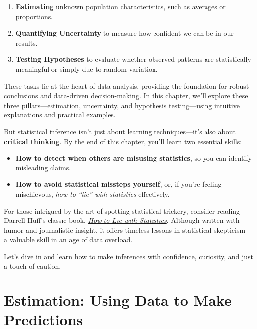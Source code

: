 \documentclass[
]{book}
\providecommand{\tightlist}{%
  \setlength{\itemsep}{0pt}\setlength{\parskip}{0pt}}
\theoremstyle{definition}
\theoremstyle{definition}
\theoremstyle{definition}
\theoremstyle{definition}
\theoremstyle{remark}
\begin{document}
\begin{enumerate}
\def\labelenumi{\arabic{enumi}.}
\tightlist
\item
  \textbf{Estimating} unknown population characteristics, such as averages or proportions.\\
\item
  \textbf{Quantifying Uncertainty} to measure how confident we can be in our results.\\
\item
  \textbf{Testing Hypotheses} to evaluate whether observed patterns are statistically meaningful or simply due to random variation.
\end{enumerate}

These tasks lie at the heart of data analysis, providing the foundation for robust conclusions and data-driven decision-making. In this chapter, we'll explore these three pillars---estimation, uncertainty, and hypothesis testing---using intuitive explanations and practical examples.

But statistical inference isn't just about learning techniques---it's also about \textbf{critical thinking}. By the end of this chapter, you'll learn two essential skills:

\begin{itemize}
\tightlist
\item
  \textbf{How to detect when others are misusing statistics}, so you can identify misleading claims.\\
\item
  \textbf{How to avoid statistical missteps yourself}, or, if you're feeling mischievous, \emph{how to ``lie'' with statistics} effectively.
\end{itemize}

For those intrigued by the art of spotting statistical trickery, consider reading Darrell Huff's classic book, \href{https://www.goodreads.com/book/show/51291.How_to_Lie_with_Statistics}{\emph{How to Lie with Statistics}}. Although written with humor and journalistic insight, it offers timeless lessons in statistical skepticism---a valuable skill in an age of data overload.

Let's dive in and learn how to make inferences with confidence, curiosity, and just a touch of caution.

\section{Estimation: Using Data to Make Predictions}\label{estimation-using-data-to-make-predictions}
\end{document}
